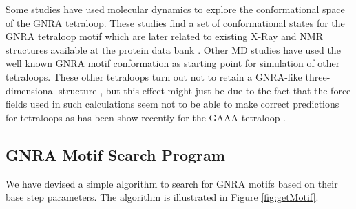 Some   studies   have  used   molecular   dynamics   to  explore   the
conformational space of  the GNRA tetraloop. These studies  find a set
of conformational states for the  GNRA tetraloop motif which are later
related to existing X-Ray and  NMR structures available at the protein
data bank \cite{depaul2010, sorin2002}. Other MD studies have used the
well known GNRA motif conformation as starting point for simulation of
other tetraloops.   These other  tetraloops turn out  not to  retain a
GNRA-like three-dimensional  structure \cite{srinivasan1998}, but this
effect might  just be due  to the fact  that the force fields  used in
such  calculations \cite{cornell1995}  seem  not to  be  able to  make
correct predictions for  tetraloops as has been show  recently for the
GAAA tetraloop \cite{spackova2010}.

\subsection{GNRA Motif Search Program}
We have  devised a simple algorithm to search for GNRA  motifs based on
their base  step parameters.  The  algorithm is illustrated  in Figure
\ref{fig:getMotif}.

